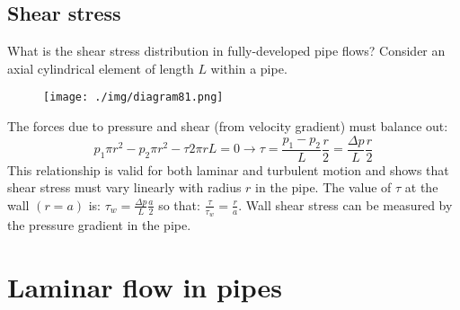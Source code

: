 \subsection{Shear stress}
What is the shear stress distribution in fully-developed pipe flows? Consider an axial cylindrical element of length $L$ within a pipe.
\begin{figure}[H]
  \centering
  \texttt{[image: ./img/diagram81.png]}
  \caption{}
\end{figure}
The forces due to pressure and shear (from velocity gradient) must balance out:
\begin{equation}
  p_1 \pi r^2 - p_2 \pi r^2 - \tau 2 \pi r L = 0 \rightarrow \tau = \frac{p_1 - p_2}{L} \frac{r}{2} = \frac{\Delta p}{L} \frac{r}{2}
\end{equation}
This relationship is valid for both laminar and turbulent motion and shows that shear stress must vary linearly with radius $r$ in the pipe. The value of $\tau$ at the wall $\left( r = a \right)$ is: $\tau_w = \frac{\Delta p}{L} \frac{a}{2}$ so that: $\frac{\tau}{\tau_w} = \frac{r}{a}$. Wall shear stress can be measured by the pressure gradient in the pipe.
\section{Laminar flow in pipes}
